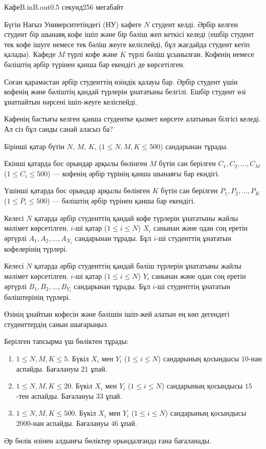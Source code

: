 \begin{problem}{Кафе}{B.in}{B.out}{0.5 секунд}{256 мегабайт}

Бүгін Нағыз Университетіндегі (НУ) кафеге $N$ студент келді. Әрбір келген студент бір шынаяқ кофе ішіп және бір бәліш жеп кеткісі келеді (ешбір студент тек кофе ішуге немесе тек бәліш жеуге келіспейді, бұл жағдайда студент кетіп қалады). Кафеде $M$ түрлі кофе және $K$ түрлі бәліш ұсынылған. Кофенің немесе бәліштің әрбір түрінен қанша бар екендігі де көрсетілген. 

Соған қарамастан әрбір студенттің өзіндік қалауы бар. Әрбір студент үшін кофенің және бәліштің қандай түрлерін ұнататыны белгілі. Ешбір студент өзі ұнатпайтын нәрсені ішіп-жеуге келіспейді.

Кафенің бастығы келген қанша студентке қызмет көрсете алатынын білгісі келеді. Ал сіз бұл санды санай аласыз ба? 


\InputFile
Бірінші қатар бүтін $N$, $M$, $K$, ($1 \le N, M, K \le 500$) сандарынан тұрады.

Екінші қатарда бос орындар арқылы бөлінген $M$ бүтін сан берілген $C_1,C_2,\dots,C_M$ ($1 \le C_i \le 500$) --- кофенің әрбір түрінің қанша шынаяғы бар екндігі.

Үшінші қатарда бос орындар арқылы бөлінген $K$ бүтін сан берілген $P_1,P_2,\dots,P_K$ ($1 \le P_i \le 500$) --- бәліштің әрбір түрінен қанша бар екендігі.

Келесі $N$ қатарда әрбір студенттің қандай кофе түрлерін ұнататыны жайлы мәлімет көрсетілген. $i$-ші қатар ($1 \le i \le N$) $X_i$ санынан және одан соң еретін әртүрлі $A_1,A_2,\dots,A_{X_i}$ сандарынан тұрады. Бұл $i$-ші студенттің ұнататын кофелерінің түрлері.

Келесі $N$ қатарда әрбір студенттің қандай бәліш түрлерін ұнататыны жайлы мәлімет көрсетілген. $i$-ші қатар ($1 \le i \le N$) $Y_i$ санынан және одан соң еретін әртүрлі $B_1,B_2,\dots,B_{Y_i}$ сандарынан тұрады. Бұл $i$-ші студенттің ұнататын бәліштерінің түрлері.

\OutputFile
Өзінің ұнайтын кофесін және бәлішін ішіп-жей алатын ең көп дегендегі студенттердің санын шығарыңыз.

\Examples

\begin{example}
%
\end{example}


\Scoring
Берілген тапсырма үш бөліктен тұрады:
\begin{enumerate}
\item $1 \le N, M, K \le 5$. Бүкіл $X_i$ мен $Y_i$ ($1 \le i \le N$) сандарының қосындысы $10$-нан аспайды. Бағалануы $21$ ұпай.
\item $1 \le N, M, K \le 20$. Бүкіл $X_i$ мен $Y_i$ ($1 \le i \le N$) сандарының қосындысы $15$-тен аспайды. Бағалануы $33$ ұпай.
\item $1 \le N, M, K \le 500$. Бүкіл $X_i$ мен $Y_i$ ($1 \le i \le N$) сандарының қосындысы $2000$-нан аспайды. Бағалануы $46$ ұпай.
\end{enumerate}

Әр бөлік өзінен алдынғы бөліктер орындалғанда ғана бағаланады.

\end{problem}
